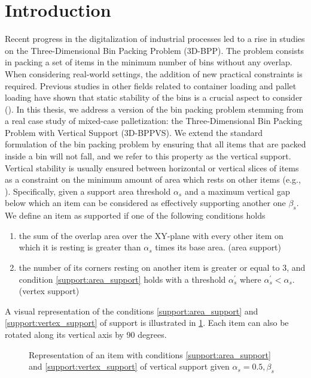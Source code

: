 \documentclass[11pt,a4paper,twocolumn]{article}
\begin{document}
\section{Introduction}
\label{sec:introduction}

Recent progress in the digitalization of industrial processes led to a rise in studies on the Three-Dimensional Bin Packing Problem (3D-BPP).
The problem consists in packing a set of items in the minimum number of bins without any overlap.
When considering real-world settings, the addition of new practical constraints is required.
Previous studies in other fields related to container loading and pallet loading have shown that static stability of the bins is a crucial aspect to consider (\cite{BORTFELDT20131}).
In this thesis, we address a version of the bin packing problem stemming from a real case study of mixed-case palletization: the Three-Dimensional Bin Packing Problem with Vertical Support (3D-BPPVS).
We extend the standard formulation of the bin packing problem by ensuring that all items that are packed inside a bin will not fall, and we refer to this property as the vertical support.
Vertical stability is usually ensured between horizontal or vertical slices of items as a constraint on the minimum amount of area which rests on other items (e.g., \cite{GZARA20201062,paquay2016mixed}).
Specifically, given a support area threshold $\alpha_s$ and a maximum vertical gap below which an item can be considered as effectively supporting another one $\beta_s$. We define an item as supported if one of the following conditions holds
\begin{enumerate}[label={\textbf{Condition \arabic*}.},ref={\arabic*},leftmargin=*]
    \item the sum of the overlap area over the XY-plane with every other item on which it is resting is greater than $\alpha_s$ times its base area. (area support) \label{support:area_support}
    \item the number of its corners resting on another item is greater or equal to 3, and condition \ref{support:area_support} holds with a threshold $\alpha^\prime_s$ where $\alpha^\prime_s < \alpha_s$. (vertex support) \label{support:vertex_support}
\end{enumerate}
A visual representation of the conditions \ref{support:area_support} and \ref{support:vertex_support} of support is illustrated in \cref{fig:support}.
Each item can also be rotated along its vertical axis by 90 degrees.

\begin{figure}[H]
    \resizebox{\columnwidth}{!}{%
    
    }
    \caption{Representation of an item with conditions \ref{support:area_support} and \ref{support:vertex_support} of vertical support given $\alpha_s = 0.5, \beta_s$}
    \label{fig:support}
\end{figure}
\end{document}
